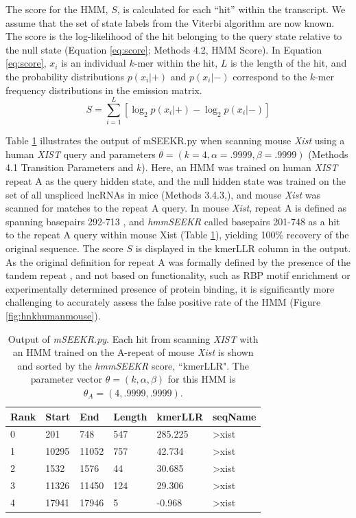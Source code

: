 The score for the HMM, $S$, is calculated for each ``hit” within the transcript. We assume that the set of state labels from the Viterbi algorithm are now known. The score is the log-likelihood of the hit belonging to the query state relative to the null state (Equation \ref{eq:score}; Methods 4.2, HMM Score). In Equation \ref{eq:score}, $x_i$ is an individual $k$-mer within the hit, $L$ is the length of the hit, and the probability distributions $p(x_i|+)$ and $p(x_i|-)$ correspond to the $k$-mer frequency distributions in the emission matrix. 
\begin{equation}
    S = \sum_{i=1}^L{\left[\log_2 p(x_i|+)- \log_2 p(x_i|-)\right]}
\label{eq:score}
\end{equation}

Table \ref{tbl:hmmresults} illustrates the output of mSEEKR.py when scanning mouse \emph{Xist} using a human \emph{XIST} query and parameters $\theta = (k=4,\alpha=.9999,\beta=.9999)$ (Methods 4.1 Transition Parameters and $k$). Here, an HMM was trained on human \emph{XIST} repeat A as the query hidden state, and the null hidden state was trained on the set of all unspliced lncRNAs in  mice (Methods 3.4.3,\cite{Derrien2012TheExpression}), and mouse \emph{Xist} was scanned for matches to the repeat A query. In mouse \emph{Xist}, repeat A is defined as spanning basepairs 292-713 \cite{Brockdorff10TheNucleus.}, and \emph{hmmSEEKR} called basepairs 201-748 as a hit to the repeat A query within mouse Xist (Table \ref{tbl:hmmresults}), yielding 100\% recovery of the original sequence. The score $S$ is displayed in the kmerLLR column in the output. As the original definition for repeat A was formally defined by the presence of the tandem repeat \cite{Brockdorff10TheNucleus.,Brown10TheNucleus.}, and not based on functionality, such as RBP motif enrichment or experimentally determined presence of protein binding, it is significantly more challenging to accurately assess the false positive rate of the HMM (Figure \ref{fig:hnkhumanmouse}).


\begin{table}[h]
\centering
\begin{tabular}{|l|l|l|l|l|l|}
\hline 
Rank&Start & End   & Length & kmerLLR & seqName                               \\
\hline 
0     & 201   & 748    & 547     & 285.225  & \textgreater{}xist \\
1     & 10295 & 11052  & 757     & 42.734   & \textgreater{}xist \\
2     & 1532  & 1576   & 44      & 30.685  & \textgreater{}xist \\
3     & 11326 & 11450  & 124     & 29.306   & \textgreater{}xist \\
4     & 17941 & 17946  & 5       & -0.968 & \textgreater{}xist\\
\hline 
\end{tabular}
\caption[\emph{mSEEKR.py} output file]{Output of \emph{mSEEKR.py}. Each hit from scanning \emph{XIST} with an HMM trained on the A-repeat of mouse \emph{Xist} is shown and sorted by the \emph{hmmSEEKR} score, ``kmerLLR". The parameter vector $\theta = (k,\alpha,\beta)$ for this HMM is $\theta_A = (4,.9999,.9999)$. }
\label{tbl:hmmresults}
\end{table}


